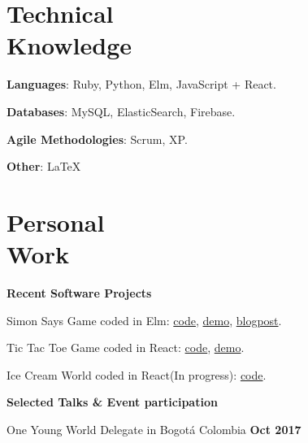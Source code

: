 \documentclass[margin,line]{resume}
\begin{document}
\begin{resume}
\vspace{2mm}


\section{\mysidestyle Technical\\Knowledge}


\textbf{Languages}: Ruby, Python, Elm, JavaScript + React. \vspace{-2mm}
    
\textbf{Databases}: MySQL, ElasticSearch, Firebase. \vspace{-2mm}
    
\textbf{Agile Methodologies}: Scrum, XP. \vspace{-2mm}

\textbf{Other}: \LaTeX \vspace{-2mm}


\newpage

\section{\mysidestyle Personal\\Work}

\textbf{Recent Software Projects}
\begin{list2}
\item Simon Says Game coded in Elm: \href{https://github.com/carohadad/simon-elm}{code}, \href{https://carohadad.github.io/simon-elm/}{demo}, \href{https://medium.com/@carohadad/mi-primer-programa-en-elm-574ce6a445c3}{blogpost}.

\item Tic Tac Toe Game coded in React: \href{https://github.com/carohadad/tic-tac-toe-react}{code}, \href{https://carohadad.github.io/tic-tac-toe-react/}{demo}.

\item Ice Cream World coded in React(In progress): \href{https://github.com/carohadad/icecream-world}{code}.
\end{list2}


\textbf{Selected Talks \& Event participation}

\begin{list2}

\item One Young World Delegate in Bogot\'a Colombia \hfill \textbf{Oct 2017}


\end{list2}
\end{resume}
\end{document}
